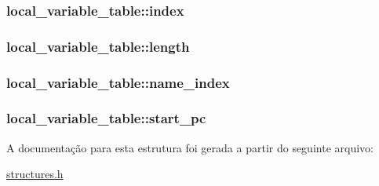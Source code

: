 \subsubsection[{\texorpdfstring{index}{index}}]{ local\+\_\+variable\+\_\+table\+::index}\hypertarget{structlocal__variable__table_af13a15b5fbb398323997b88d341a6c38}{}\label{structlocal__variable__table_af13a15b5fbb398323997b88d341a6c38}
\subsubsection[{\texorpdfstring{length}{length}}]{ local\+\_\+variable\+\_\+table\+::length}\hypertarget{structlocal__variable__table_a76b778cea6d99b0854cba21e223569cc}{}\label{structlocal__variable__table_a76b778cea6d99b0854cba21e223569cc}
\subsubsection[{\texorpdfstring{name\+\_\+index}{name_index}}]{ local\+\_\+variable\+\_\+table\+::name\+\_\+index}\hypertarget{structlocal__variable__table_a6c91f7b672683a35b1433c429de69069}{}\label{structlocal__variable__table_a6c91f7b672683a35b1433c429de69069}
\subsubsection[{\texorpdfstring{start\+\_\+pc}{start_pc}}]{ local\+\_\+variable\+\_\+table\+::start\+\_\+pc}\hypertarget{structlocal__variable__table_aa86e910619df9b3284535529bc887a12}{}\label{structlocal__variable__table_aa86e910619df9b3284535529bc887a12}


A documentação para esta estrutura foi gerada a partir do seguinte arquivo\+:\begin{DoxyCompactItemize}
\item 
\hyperlink{structures_8h}{structures.\+h}\end{DoxyCompactItemize}
